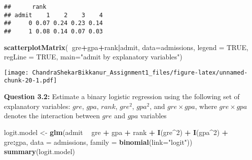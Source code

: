 \documentclass[]{article}
\newenvironment{Shaded}{\begin{snugshade}}{\end{snugshade}}
\newcommand{\DataTypeTok}[1]{\textcolor[rgb]{0.13,0.29,0.53}{#1}}
\newcommand{\DecValTok}[1]{\textcolor[rgb]{0.00,0.00,0.81}{#1}}
\newcommand{\KeywordTok}[1]{\textcolor[rgb]{0.13,0.29,0.53}{\textbf{#1}}}
\newcommand{\NormalTok}[1]{#1}
\newcommand{\OperatorTok}[1]{\textcolor[rgb]{0.81,0.36,0.00}{\textbf{#1}}}
\newcommand{\OtherTok}[1]{\textcolor[rgb]{0.56,0.35,0.01}{#1}}
\newcommand{\StringTok}[1]{\textcolor[rgb]{0.31,0.60,0.02}{#1}}
\begin{document}
\begin{verbatim}
##      rank
## admit    1    2    3    4
##     0 0.07 0.24 0.23 0.14
##     1 0.08 0.14 0.07 0.03
\end{verbatim}

\begin{Shaded}
\begin{Highlighting}[]
\KeywordTok{scatterplotMatrix}\NormalTok{(}\OperatorTok{~}\NormalTok{gre}\OperatorTok{+}\NormalTok{gpa}\OperatorTok{+}\NormalTok{rank}\OperatorTok{|}\NormalTok{admit, }\DataTypeTok{data=}\NormalTok{admissions, }\DataTypeTok{legend =} \OtherTok{TRUE}\NormalTok{, }\DataTypeTok{regLine =} \OtherTok{TRUE}\NormalTok{,  }\DataTypeTok{main=}\StringTok{"admit by explanatory variables"}\NormalTok{)}
\end{Highlighting}
\end{Shaded}

\texttt{[image: ChandraShekarBikkanur\_Assignment1\_files/figure-latex/unnamed-chunk-20-1.pdf]}

\textbf{Question 3.2:} Estimate a binary logistic regression using the
following set of explanatory variables: \(gre\), \(gpa\), \(rank\),
\(gre^2\), \(gpa^2\), and \(gre \times gpa\), where \(gre \times gpa\)
denotes the interaction between \(gre\) and \(gpa\) variables

\begin{Shaded}
\begin{Highlighting}[]
\NormalTok{logit.model <-}\StringTok{ }\KeywordTok{glm}\NormalTok{(admit }\OperatorTok{~}\StringTok{ }\NormalTok{gre }\OperatorTok{+}\StringTok{ }\NormalTok{gpa }\OperatorTok{+}\StringTok{ }\NormalTok{rank }\OperatorTok{+}\StringTok{ }\KeywordTok{I}\NormalTok{(gre}\OperatorTok{^}\DecValTok{2}\NormalTok{) }\OperatorTok{+}\StringTok{ }\KeywordTok{I}\NormalTok{(gpa}\OperatorTok{^}\DecValTok{2}\NormalTok{) }\OperatorTok{+}\StringTok{ }\NormalTok{gre}\OperatorTok{:}\NormalTok{gpa, }\DataTypeTok{data =}\NormalTok{ admissions, }\DataTypeTok{family =} \KeywordTok{binomial}\NormalTok{(}\DataTypeTok{link=}\StringTok{"logit"}\NormalTok{))}
\KeywordTok{summary}\NormalTok{(logit.model)}
\end{Highlighting}
\end{Shaded}
\end{document}
